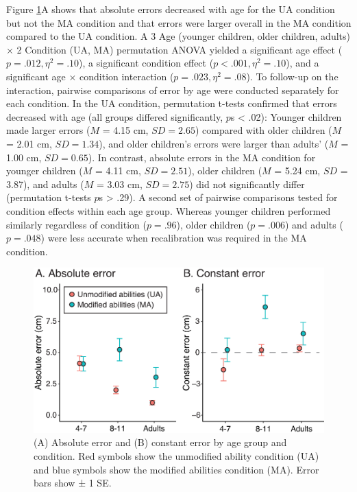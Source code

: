 \documentclass[a4paper,man,natbib,floatsintext,noextraspace]{apa6}
\begin{document}
Figure \ref{fig:error}A shows that absolute errors decreased with age for the UA condition but not the MA condition and that errors were larger overall in the MA condition compared to the UA condition. A 3 Age (younger children, older children, adults) × 2 Condition (UA, MA) permutation ANOVA yielded a significant age effect ($p = .012, \eta^{2} = .10$), a significant condition effect ($p < .001, \eta^{2} = .10$), and a significant age × condition interaction ($p = .023, \eta^{2} = .08$). To follow-up on the interaction, pairwise comparisons of error by age were conducted separately for each condition. In the UA condition, permutation t-tests confirmed that errors decreased with age (all groups differed significantly, $p$s < .02): Younger children made larger errors ($M$ = 4.15 cm, $SD = 2.65$) compared with older children ($M$ = 2.01 cm, $SD = 1.34$), and older children's errors were larger than adults' ($M$ = 1.00 cm, $SD = 0.65$). In contrast, absolute errors in the MA condition for younger children ($M$ = 4.11 cm, $SD = 2.51$), older children ($M$ = 5.24 cm, $SD$ = 3.87), and adults ($M$ = 3.03 cm, $SD = 2.75$) did not significantly differ (permutation t-tests $p$s > .29). A second set of pairwise comparisons tested for condition effects within each age group. Whereas younger children performed similarly regardless of condition ($p = .96$), older children ($p = .006$) and adults ($p = .048$) were less accurate when recalibration was required in the MA condition.

\begin{figure}[htb!]
\centering
\includegraphics[width=1\textwidth]{error.eps}
\caption{\label{fig:error}(A) Absolute error and (B) constant error by age group and condition. Red symbols show the unmodified ability condition (UA) and blue symbols show the modified abilities condition (MA). Error bars show ± 1 SE.}
\end{figure}
\end{document}
